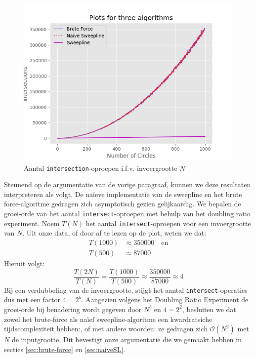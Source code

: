\documentclass[12pt]{article}
\begin{document}
\begin{figure}[H]
	\centering
	\includegraphics[width=\linewidth]{../plots/ThreeAlgorithmsVisualised.png}
	\caption{Aantal \texttt{intersection}-oproepen i.f.v. invoergrootte $N$}
	\label{fig:IntersectionsIfvN}
\end{figure}

Steunend op de argumentatie van de vorige paragraaf, kunnen we deze resultaten interpreteren als volgt. De naïeve implementatie van de sweepline en het brute force-algoritme gedragen zich asymptotisch gezien gelijkaardig. We bepalen de groei-orde van het aantal \texttt{intersect}-oproepen met behulp van het doubling ratio experiment. Noem $T(N)$ het aantal \texttt{intersect}-oproepen voor een invoergrootte van $N$. Uit onze data, of door af te lezen op de plot, weten we dat:
\begin{align*}
T(1000) &\approx 350000 \quad\text{en}\\
T(500) &\approx 87000
\end{align*}
Hieruit volgt:
\begin{equation*}
\frac{T(2N)}{T(N)} = \frac{T(1000)}{T(500)} \approx \frac{350000}{87000} \approx 4
\end{equation*}
Bij een verdubbeling van de invoergrootte, stijgt het aantal \texttt{intersect}-operaties dus met een factor $4  =2^b$. Aangezien volgens het Doubling Ratio Experiment de groei-orde bij benadering wordt gegeven door $N^b$ en $4 = 2^2$, besluiten we dat zowel het brute-force als naïef sweepline-algoritme een kwardratsiche tijdscomplexiteit hebben:, of met andere woorden: ze gedragen zich $\mathcal{O}(N^2)$ met $N$ de inputgrootte. Dit bevestigt onze argumentatie die we gemaakt hebben in secties \ref{sec:brute-force} en \ref{sec:naiveSL}.
\end{document}
